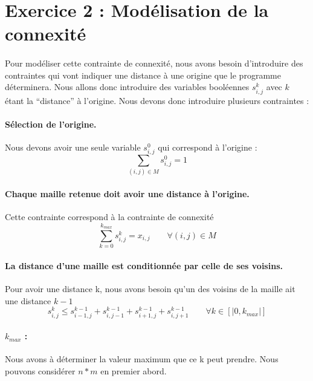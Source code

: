 \documentclass[a4paper, 11pt]{article} %
\begin{document}
\section{Exercice 2 : Modélisation de la connexité}
\paragraph*{}
Pour modéliser cette contrainte de connexité, nous avons besoin d'introduire des contraintes qui vont indiquer une distance à une origine que le programme déterminera. Nous allons donc introduire des variables booléennes $s_{i,j}^k$ avec $k$ étant la ``distance'' à l'origine. Nous devons donc introduire plusieurs contraintes :

\paragraph*{Sélection de l'origine.}
Nous devons avoir une seule variable $s_{i,j}^0$ qui correspond à l'origine :
$$ 
  \sum_{(i,j)\in M} s_{i,j}^0 = 1
$$

\paragraph*{Chaque maille retenue doit avoir une distance à l'origine.} Cette contrainte correspond à la contrainte de connexité
$$ 
  \sum_{k = 0}^{k_{max}} s_{i,j}^k = x_{i,j}  \qquad \forall (i,j) \in M
$$ 

\paragraph*{La distance d'une maille est conditionnée par celle de ses voisins.} Pour avoir une distance k, nous avons besoin qu'un des voisins de la maille ait une distance $k-1$
$$ 
  s_{i,j}^k \leq s_{i-1,j}^{k-1} + s_{i,j-1}^{k-1} + s_{i+1,j}^{k-1} + s_{i,j+1}^{k-1} \qquad \forall k \in [|0,k_{max}|]
$$ 

\paragraph*{$k_{max}$ :} Nous avons à déterminer la valeur maximum que ce k peut prendre. Nous pouvons considérer $n*m$ en premier abord.
\end{document}
